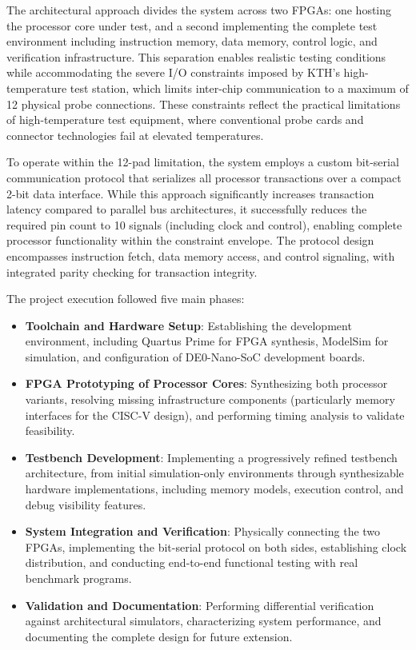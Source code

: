 \documentclass[12pt]{article}
\begin{document}
The architectural approach divides the system across two FPGAs: one hosting the processor core under test, and a second implementing the complete test environment including instruction memory, data memory, control logic, and verification infrastructure. This separation enables realistic testing conditions while accommodating the severe I/O constraints imposed by KTH's high-temperature test station, which limits inter-chip communication to a maximum of 12 physical probe connections. These constraints reflect the practical limitations of high-temperature test equipment, where conventional probe cards and connector technologies fail at elevated temperatures.

To operate within the 12-pad limitation, the system employs a custom bit-serial communication protocol that serializes all processor transactions over a compact 2-bit data interface. While this approach significantly increases transaction latency compared to parallel bus architectures, it successfully reduces the required pin count to 10 signals (including clock and control), enabling complete processor functionality within the constraint envelope. The protocol design encompasses instruction fetch, data memory access, and control signaling, with integrated parity checking for transaction integrity.

The project execution followed five main phases:

\begin{itemize}
  \item \textbf{Toolchain and Hardware Setup}: Establishing the development environment, including Quartus Prime for FPGA synthesis, ModelSim for simulation, and configuration of DE0-Nano-SoC development boards.
  
  \item \textbf{FPGA Prototyping of Processor Cores}: Synthesizing both processor variants, resolving missing infrastructure components (particularly memory interfaces for the CISC-V design), and performing timing analysis to validate feasibility.
  
  \item \textbf{Testbench Development}: Implementing a progressively refined testbench architecture, from initial simulation-only environments through synthesizable hardware implementations, including memory models, execution control, and debug visibility features.
  
  \item \textbf{System Integration and Verification}: Physically connecting the two FPGAs, implementing the bit-serial protocol on both sides, establishing clock distribution, and conducting end-to-end functional testing with real benchmark programs.
  
  \item \textbf{Validation and Documentation}: Performing differential verification against architectural simulators, characterizing system performance, and documenting the complete design for future extension.
\end{itemize}
\end{document}
